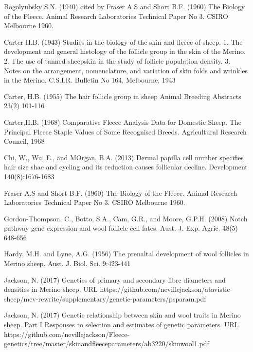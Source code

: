 \documentclass[titlepage]{article}  %
\begin{document}
\clearpage
\begin{thebibliography}{99}

 Bogolyubsky S.N. (1940) cited by Fraser A.S and Short B.F. (1960) The Biology of the Fleece. Animal Research Laboratories Technical Paper No 3. CSIRO Melbourne 1960.


Carter H.B. (1943) Studies in the biology of the skin and fleece of sheep. 1. The development and general histology of the follicle group in the skin of the Merino. 2. The use of tanned sheepskin in the study of follicle population density. 3. Notes on the arrangement, nomenclature, and variation of skin folds and wrinkles in the Merino. C.S.I.R. Bulletin No 164, Melbourne, 1943

Carter, H.B. (1955) The hair follicle group in sheep Animal Breeding Abstracts 23(2) 101-116

Carter,H.B. (1968) Comparative Fleece Analysis Data for Domestic Sheep. The Principal Fleece Staple Values of Some Recognised Breeds. Agricultural Research Council, 1968

Chi, W., Wu, E., and MOrgan, B.A. (2013) Dermal papilla cell number specifies hair size shae and cycling and its reduction causes follicular decline. Development 140(8):1676-1683

Fraser A.S and Short B.F. (1960) The Biology of the Fleece. Animal Research Laboratories Technical Paper No 3. CSIRO Melbourne 1960.

Gordon-Thompson, C., Botto, S.A., Cam, G.R., and Moore, G.P.H. (2008) Notch pathway gene expression and wool follicle cell fates. Aust. J. Exp. Agric. 48(5) 648-656

Hardy, M.H. and Lyne, A.G. (1956) The prenaltal development of wool follicles in Merino sheep. Aust. J. Biol. Sci. 9:423-441

Jackson, N. (2017) Genetics of primary and secondary fibre diameters and densities in Merino sheep. URL https://github.com/nevillejackson/atavistic-sheep/mev-rewrite/supplementary/genetic-parameters/psparam.pdf

Jackson, N. (2017) Genetic relationship between skin and wool traits in Merino sheep. Part I Responses to selection and estimates of genetic parameters. URL https://github.com/nevillejackson/Fleece-genetics/tree/master/skinandfleeceparameters/ab3220/skinwool1.pdf



\end{thebibliography}
\end{document}
